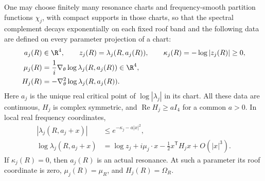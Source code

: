 \begin{lemma}
\label{lem:v41-moving-maxima}
One may choose finitely many resonance charts and frequency-smooth
partition functions $\chi_j$, with compact supports in those charts,
so that the spectral complement decays exponentially on each fixed
roof band and the following data are defined on every parameter
projection of a chart:
\begin{align}
 a_j(R)&\in\R^4,\qquad
 z_j(R)=\lambda_j(R,a_j(R)),\qquad
 \kappa_j(R)=-\log|z_j(R)|\ge0,\notag\\
 \mu_j(R)&=\frac1i\nabla_\theta\log\lambda_j(R,a_j(R))\in\R^4,\notag\\
 H_j(R)&=-\nabla_\theta^2\log\lambda_j(R,a_j(R)).
                                      \label{eq:v41-peak-data}
\end{align}
Here $a_j$ is the unique real critical point of
$\log|\lambda_j|$ in its chart. All these data are continuous, $H_j$ is
complex symmetric, and $\operatorname{Re}H_j\ge aI_4$ for a common
$a>0$. In local real frequency coordinates,
\begin{align}
 |\lambda_j(R,a_j+x)|&\le e^{-\kappa_j-a|x|^2},
                                      \label{eq:v41-peak-bound}\\
 \log\lambda_j(R,a_j+x)
  &=\log z_j+i\mu_j\cdot x-\tfrac12x^{\mathsf T}H_jx+O(|x|^3).
                                      \label{eq:v41-peak-taylor}
\end{align}
If $\kappa_j(R)=0$, then $a_j(R)$ is an actual resonance. At such a
parameter its roof coordinate is zero, $\mu_j(R)=\mu_R$, and
$H_j(R)=\Omega_R$.
\end{lemma}
